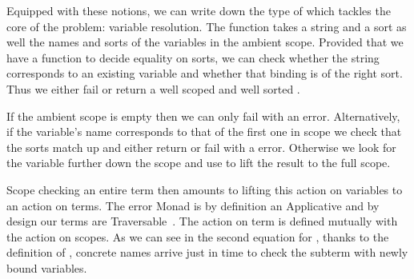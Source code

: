 Equipped with these notions, we can write down the type of  which
tackles the core of the problem: variable resolution. The function takes a
string and a sort as well the names and sorts of the variables in the ambient
scope. Provided that we have a function  to decide equality on sorts,
we can check whether the string corresponds to an existing variable and whether
that binding is of the right sort. Thus we either fail or return a well scoped
and well sorted .

If the ambient scope is empty then we can only fail with an  error.
Alternatively, if the variable's name corresponds to that of the first one
in scope we check that the sorts match up and either return  or fail
with a  error. Otherwise we look for the variable further
down the scope and use  to lift the result to the full scope.

\begin{center}
\end{center}

Scope checking an entire term then amounts to lifting this action on
variables to an action on terms. The error Monad  is by
definition an Applicative and by design our terms are
Traversable~\cite{bird_paterson_1999,DBLP:journals/jfp/GibbonsO09}.
The action on term is defined mutually with the action on scopes.
As we can see in the second equation for , thanks to the
definition of , concrete names arrive just in time to
check the subterm with newly bound variables.

\begin{center}
\end{center}

